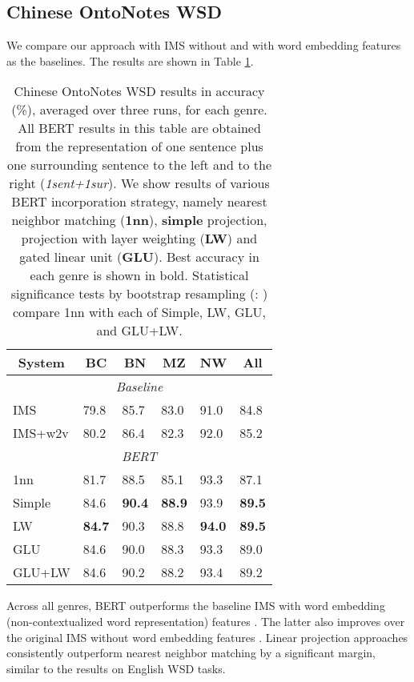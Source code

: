 \documentclass[11pt,a4paper]{article}
\begin{document}
\subsection{Chinese OntoNotes WSD}
\label{sec:results_chinese}

We compare our approach with IMS without and with word embedding features as the baselines. The results are shown in Table \ref{tab:results_chinese}.

\begin{table}[htbp]
\small
\centering
\begin{tabular}{|l|l|l|l|l|l|}
\hline
\multicolumn{1}{|c|}{\textbf{System}} & \multicolumn{1}{c|}{\textbf{BC}} & \multicolumn{1}{c|}{\textbf{BN}} & \multicolumn{1}{c|}{\textbf{MZ}} & \multicolumn{1}{c|}{\textbf{NW}} & \multicolumn{1}{c|}{\textbf{All}} \\
\hline
\multicolumn{6}{|c|}{\textit{Baseline}} \\
\hline
IMS   & 79.8  & 85.7  & 83.0  & 91.0  & 84.8  \\
IMS+w2v & 80.2  & 86.4  & 82.3  & 92.0  & 85.2  \\
\hline
\multicolumn{6}{|c|}{\textit{BERT}} \\
\hline
1nn & 81.7  & 88.5  & 85.1  & 93.3  & 87.1  \\
\hline
Simple & 84.6  & \textbf{90.4}  & \textbf{88.9} & 93.9 & \textbf{89.5}  \\
LW & \textbf{84.7} & 90.3 & 88.8 & \textbf{94.0} & \textbf{89.5}  \\
GLU & 84.6 & 90.0 & 88.3 & 93.3 & 89.0 \\
GLU+LW & 84.6 & 90.2 & 88.2 & 93.4 & 89.2 \\
\hline
\end{tabular}
\caption{\label{tab:results_chinese} Chinese OntoNotes WSD results in accuracy (\%), averaged over three runs, for each genre. All BERT results in this table are obtained from the representation of one sentence plus one surrounding sentence to the left and to the right (\textit{1sent+1sur}). We show results of various BERT incorporation strategy, namely nearest neighbor matching (\textbf{1nn}), \textbf{simple} projection, projection with layer weighting (\textbf{LW}) and gated linear unit (\textbf{GLU}). Best accuracy in each genre is shown in bold.
Statistical significance tests by bootstrap resampling (: ) compare 1nn with each of Simple, LW, GLU, and GLU+LW.}
\end{table} 
Across all genres, BERT outperforms the baseline IMS with word embedding (non-contextualized word representation) features \cite{taghipour_semi-supervised_2015}. The latter also improves over the original IMS without word embedding features \cite{zhong_it_2010}. Linear projection approaches consistently outperform nearest neighbor matching by a significant margin, similar to the results on English WSD tasks.
\end{document}
